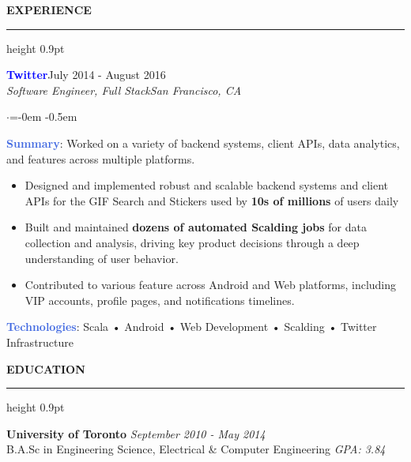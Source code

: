 \documentclass[
    11pt, %
]{resume} %
\newenvironment{rSectionCustom}[1]{
  \Large
  \sectionskip
  \textbf{\textcolor{Cerulean}{\MakeUppercase{#1}}}
  \vspace{0.5em}
  {\color{Blue}\hrule height 0.9pt}
  \vspace{0.25em}

  \begin{list}{}{
    \setlength{\leftmargin}{1.5em}
  }
  \item[]
}{
    \vspace{1em}
  \end{list}
}
\newenvironment{rSubsection2}[4]{
  \normalsize
  \hspace{-18pt}\textcolor{Blue}{\textbf{\large #1}}\hfill{#2}
  \\
  \hspace*{-18pt}\emph{#3}\hfill\emph{#4}
  \begin{list}{$\cdot$}{\leftmargin=-0em}
  \itemsep -0.5em \vspace{-0.25em}
}{
\vspace{1em}
  \end{list}
}
\begin{document}
\begin{rSectionCustom}{Experience}
    \begin{rSubsection2}{Twitter}{July 2014 - August 2016}{Software Engineer, Full Stack}{San Francisco, CA}
        \item[] \textcolor{RoyalBlue}{\textbf{Summary}}: Worked on a variety of backend systems, client APIs, data analytics, and features across multiple platforms.
        \begin{itemize}[leftmargin=*]
            \item Designed and implemented robust and scalable backend systems and client APIs for the GIF Search and Stickers used by \textbf{10s of millions} of users daily
            \item Built and maintained \textbf{dozens of automated Scalding jobs} for data collection and analysis, driving key product decisions through a deep understanding of user behavior.
            \item Contributed to various feature across Android and Web platforms, including VIP accounts, profile pages, and notifications timelines.
            \end{itemize}
        \vspace{0.5em}
        \item[] \textcolor{RoyalBlue}{\textbf{Technologies}}: Scala • Android • Web Development • Scalding • Twitter Infrastructure
    \end{rSubsection2}

\end{rSectionCustom}


\begin{rSectionCustom}{Education}
    \normalsize\textbf{University of Toronto} \hfill \textit{September 2010 - May 2014} \\
        B.A.Sc in Engineering Science, Electrical \& Computer Engineering \hfill \emph{GPA: 3.84}
\end{rSectionCustom}


\end{document}
